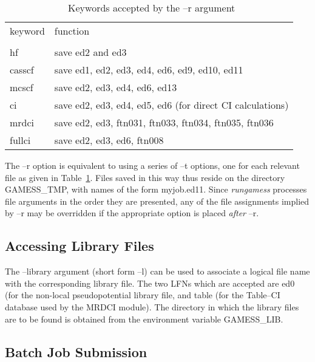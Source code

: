 \documentclass[11pt,fleqn]{article}
\begin{document}
\begin{table}
 \caption{\label{table:1}\ Keywords accepted by the --r argument}
 
 \begin{centering}
 \begin{tabular}{ll}
\\ \hline\hline
 keyword &  function \\ \cline{1-2}
\\
hf  &  save ed2 and ed3 \\
casscf & save ed1, ed2, ed3, ed4, ed6, ed9, ed10, ed11\\
mcscf & save ed2, ed3, ed4, ed6, ed13 \\
ci & save ed2, ed3, ed4, ed5, ed6 (for direct CI calculations) \\
mrdci & save ed2, ed3, ftn031, ftn033, ftn034, ftn035, ftn036\\
fullci & save ed2, ed3, ed6, ftn008 \\
\hline\hline
 \end{tabular}
 
 \end{centering}
\end{table}

The --r option is equivalent to using a series of --t options,
one for each relevant file as given in Table~\ref{table:1}. Files saved in this
way thus reside on the directory GAMESS\_TMP, with names of the form myjob.ed11.
Since {\em rungamess} processes file arguments in the order they are presented,
any of the file assignments implied by --r may be overridden if the
appropriate option is placed {\em after} --r.

\subsection[Accessing Library Files]{Accessing Library Files}

The --library argument (short form --l) can be used to associate
a logical file name with the corresponding library file. The two 
LFNs which are accepted are ed0 (for the non-local pseudopotential library
file, and table (for the Table--CI database used by the MRDCI module).
The directory in which the library files are to be found is obtained
from the environment variable GAMESS\_LIB.

\subsection[Batch Job Submission]{Batch Job Submission}
\end{document}
